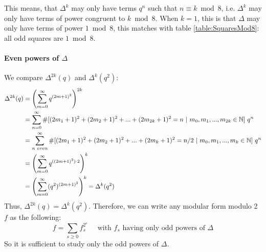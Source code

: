 This means, that $\Delta^k$ may only have terms $q^n$ such that $n \equiv k \bmod 8$, i.e. $\Delta^k$ may only have terms of power congruent to $k \bmod 8$.
When $k=1$, this is that $\Delta$ may only have terms of power $1 \bmod 8$, this matches with table \ref{table:SquaresMod8}: all odd squares are $1 \bmod 8$.
\label{ObservationsMod8}

\paragraph{Even powers of $\Delta$}
We compare $\Delta^{2k}(q)$ and $\Delta^k(q^2)$:
\begin{align*}
	\Delta^{2k}(q) 
	&= \left( \sum_{m=0}^{\infty} q^{(2m+1)^2} \right)^{2k} \\
	&= \sum_{n=0}^{\infty} \#[ (2m_1+1)^2+(2m_2+1)^2+...+(2m_{2k}+1)^2=n \ | \  m_0,m_1,...,m_{2k} \in \mathbb{N} ] \  q^n\\
	&= \sum_{n \ even}^{\infty} \#[ (2m_1+1)^2+(2m_2+1)^2+...+(2m_k+1)^2=n/2 \ | \  m_0,m_1,...,m_k \in \mathbb{N} ] \  q^n\\
	&= \left( \sum_{m=0}^{\infty} q^{((2m+1)^2) \cdot 2} \right)^k \\
	&= \left( \sum_{m=0}^{\infty} (q^2)^{(2m+1)^2} \right)^k = \Delta^{k}(q^2)
\end{align*}
Thus, $\Delta^{2k}(q) = \Delta^k(q^2)$.
Therefore, we can write any modular form modulo 2 $f$ as the following:
$$
f = \sum_{s \geq 0} f_s^{2^s} \quad \text{ with } f_s \text{ having only odd powers of } \Delta
$$
\cite[(3)]{OrdreNilpotenceOperateurHecke}
So it is sufficient to study only the odd powers of $\Delta$.


